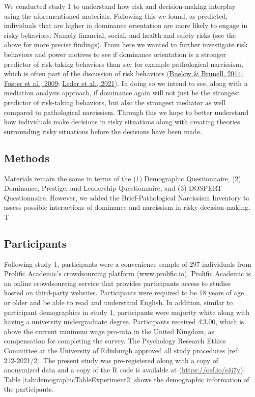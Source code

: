 \documentclass[
  donotrepeattitle,doc, 12pt, a4paper,floatsintext]{apa7}
\begin{document}
We conducted study 1 to understand how risk and decision-making interplay using the aforementioned materials. Following this we found, as predicted, individuals that are higher in dominance orientation are more likely to engage in risky behaviors. Namely financial, social, and health and safety risks (see the above for more precise findings). From here we wanted to further investigate risk behaviors and power motives to see if dominance orientation is a stronger predictor of risk-taking behaviors than say for example pathological narcissism, which is often part of the discussion of risk behaviors (\protect\hyperlink{ref-buelow2014}{Buelow \& Brunell, 2014}; \protect\hyperlink{ref-foster2009}{Foster et al., 2009}; \protect\hyperlink{ref-leder2021}{Leder et al., 2021}). In doing so we intend to see, along with a mediation analysis approach, if dominance again will not just be the strongest predictor of risk-taking behaviors, but also the strongest mediator as well compared to pathological narcissism. Through this we hope to better understand how individuals make decisions in risky situations along with creating theories surrounding risky situations before the decisions have been made.

\hypertarget{methods-1}{%
\subsection{Methods}\label{methods-1}}

Materials remain the same in terms of the (1) Demographic Questionnaire, (2) Dominance, Prestige, and Leadership Questionnaire, and (3) DOSPERT Questionnaire. However, we added the Brief-Pathological Narcissism Inventory to assess possible interactions of dominance and narcissism in risky decision-making. T

\hypertarget{participants}{%
\subsection{Participants}\label{participants}}

Following study 1, participants were a convenience sample of 297 individuals from Prolific Academic's crowdsourcing platform (www.prolific.io). Prolific Academic is an online crowdsourcing service that provides participants access to studies hosted on third-party websites. Participants were required to be 18 years of age or older and be able to read and understand English. In addition, similar to participant demographics in study 1, participants were majority white along with having a university undergraduate degree. Participants received £3.00, which is above the current minimum wage pro-rata in the United Kingdom, as compensation for completing the survey. The Psychology Research Ethics Committee at the University of Edinburgh approved all study procedures {[}ref: 212-2021/2{]}. The present study was pre-registered along with a copy of anonymized data and a copy of the R code is available at (\url{https://osf.io/s4j7y}). Table \ref{tab:demographicTableExperiment2} shows the demographic information of the participants.
\end{document}

